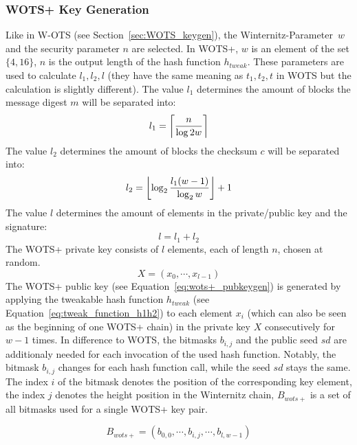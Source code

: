 \subsubsection{WOTS+ Key Generation}
\label{sec:wots+_keygen}
Like in W-OTS (see Section~\ref{sec:WOTS_keygen}), the Winternitz-Parameter~$w$ and the security parameter $n$ are selected. In WOTS+, $w$ is an element of the set $\{4, 16\}$, $n$ is the output length of the hash function $h_{tweak}$.
These parameters are used to calculate $l_1, l_2, l$ (they have the same meaning as $t_1, t_2, t$ in WOTS but the calculation is slightly different).
The value $l_1$ determines the amount of blocks the message digest $m$ will be separated into:
\begin{equation}
l_1 = \ceil*{\frac{n}{\log{2}w}}
\end{equation}
The value $l_2$ determines the amount of blocks the checksum $c$ will be separated into: 
\begin{equation}
l_2 = \floor*{\log_{2} \frac{l_1 (w-1)}{\log_{2}w} } +1
\end{equation}
The value $l$ determines the amount of elements in the private/public key and the signature:
\begin{equation}
l = l_1 + l_2
\end{equation}
The WOTS+ private key consists of $l$ elements, each of length $n$, chosen at random.
\begin{equation}
\label{eq:wots+_privkey}
X = (x_0, \cdots, x_{l-1})
\end{equation}
The WOTS+ public key (see Equation~\ref{eq:wots+_pubkeygen}) is generated by applying the tweakable hash function $h_{tweak}$ (see Equation~\ref{eq:tweak_function_h1h2}) to each element $x_i$ (which can also be seen as the beginning of one WOTS+ chain) in the private key $X$ consecutively for $w-1$ times. In difference to WOTS, the bitmasks $b_{i,j}$ and the public seed $sd$ are additionaly needed for each invocation of the used hash function. Notably, the bitmask $b_{i,j}$ changes for each hash function call, while the seed $sd$ stays the same. The index $i$ of the bitmask denotes the position of the corresponding key element, the index $j$ denotes the height position in the Winternitz chain, $B_{wots+}$ is a set of all bitmasks used for a single WOTS+ key pair.

\begin{equation}
\label{eq:wots+_all_bitmasks}
B_{wots+} = (b_{0,0}, \cdots, b_{i,j}, \cdots, b_{l,w-1})
\end{equation}

